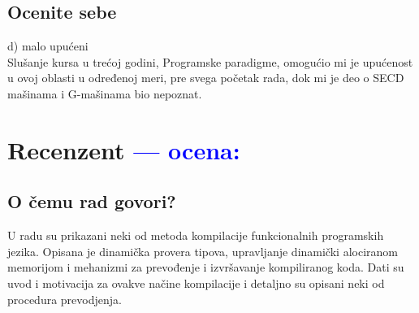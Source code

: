 \documentclass[a4paper]{report}
\newcommand{\odgovor}[1]{\textcolor{blue}{#1}}
\begin{document}
\section{Ocenite sebe}
 d) malo upućeni  \\ 
Slušanje kursa u trećoj godini, Programske paradigme, omogućio mi je upućenost u ovoj oblasti u određenoj meri, pre svega početak rada, dok mi je deo o SECD mašinama i G-mašinama bio nepoznat.


\chapter{Recenzent \odgovor{--- ocena:} }


\section{O čemu rad govori?}
U radu su prikazani neki od metoda kompilacije funkcionalnih programskih jezika.
Opisana je dinamička provera tipova, upravljanje dinamički alociranom memorijom i mehanizmi za prevođenje i izvršavanje kompiliranog koda. Dati su uvod i motivacija za ovakve načine kompilacije i detaljno su opisani neki od procedura prevodjenja.
\end{document}
